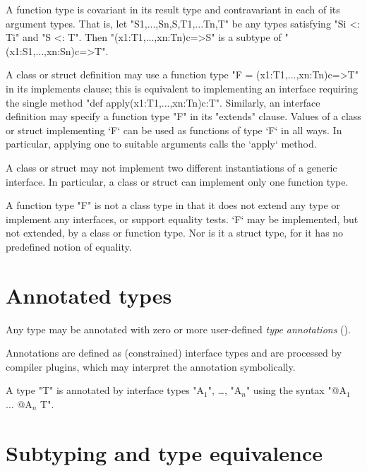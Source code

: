 A function type is covariant in its result type and contravariant in
each of its argument types. That is, let 
\xcd"S1,...,Sn,S,T1,...Tn,T" be any
types satisfying \xcd"Si <: Ti" and \xcd"S <: T". Then
\xcd"(x1:T1,...,xn:Tn){c}=>S" is a subtype of
\xcd"(x1:S1,...,xn:Sn){c}=>T".

A class or struct definition may use a function type 
\xcd"F = (x1:T1,...,xn:Tn){c}=>T" in its 
implements clause; 
this is equivalent to implementing an interface requiring the single method
\xcd"def apply(x1:T1,...,xn:Tn){c}:T". 
Similarly, an interface
definition may specify a function type \xcd"F" in its \xcd"extends" clause.
Values of a class or struct implementing \xcd`F` 
can be used as functions of type \xcd`F` in all ways.  
In particular, applying one to suitable arguments calls the \xcd`apply`
method. 

\limitationx{} A class or struct may not implement two different
instantiations of a generic interface. In particular, a class or
struct can implement only one function type.


A function type \xcd"F" is not a class type in that it does not extend any
type or implement any interfaces, or support equality tests. 
\xcd`F` may be implemented, but not extended, by a class or function type. 
Nor is it a struct type, for it has no predefined notion of equality.


\section{Annotated types}
\label{AnnotatedTypes}


        Any \Xten{} type may be annotated with zero or more
        user-defined \emph{type annotations}
        ().  

        Annotations are defined as (constrained) interface types and are
        processed by compiler plugins, which may interpret the
        annotation symbolically.

        A type \xcd"T" is annotated by interface types
        \xcdmath"A$_1$", \dots,
        \xcdmath"A$_n$"
        using the syntax
        \xcdmath"@A$_1$ $\dots$ @A$_n$ T".

\section{Subtyping and type equivalence}\label{DepType:Equivalence}

